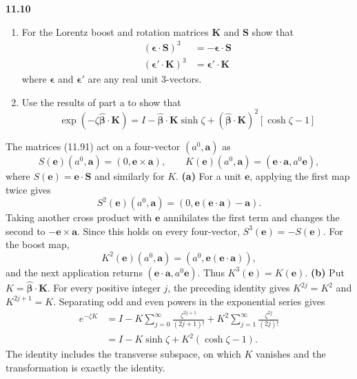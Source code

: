 \par\bigskip
\noindent\textbf{11.10}\quad\begin{enumerate}
\item[(a)] For the Lorentz boost and rotation matrices $\mathbf{K}$ and $\mathbf{S}$ show that
\begin{align*}
(\boldsymbol{\epsilon}\cdot\mathbf{S})^{3}&=-\boldsymbol{\epsilon}\cdot\mathbf{S}\\
(\boldsymbol{\epsilon}'\cdot\mathbf{K})^{3}&=\boldsymbol{\epsilon}'\cdot\mathbf{K}
\end{align*}
where $\boldsymbol{\epsilon}$ and $\boldsymbol{\epsilon}'$ are any real unit 3-vectors.
\item[(b)] Use the results of part a to show that
\[
\exp(-\zeta\hat{\boldsymbol{\beta}}\cdot\mathbf{K})=I-\hat{\boldsymbol{\beta}}\cdot\mathbf{K}\sinh\zeta+(\hat{\boldsymbol{\beta}}\cdot\mathbf{K})^{2}[\cosh\zeta-1]
\]
\end{enumerate}
\solution
The matrices (11.91) act on a four-vector $(a^0,\mathbf a)$ as
\[
S(\mathbf e)(a^0,\mathbf a)=(0,\mathbf e\times\mathbf a),\qquad
K(\mathbf e)(a^0,\mathbf a)=(\mathbf e\cdot\mathbf a,a^0\mathbf e),
\]
where $S(\mathbf e)=\mathbf e\cdot\mathbf S$ and similarly for $K$.
\textbf{(a)} For a unit $\mathbf e$, applying the first map twice gives
\[
S^2(\mathbf e)(a^0,\mathbf a)
=(0,\mathbf e(\mathbf e\cdot\mathbf a)-\mathbf a).
\]
Taking another cross product with $\mathbf e$ annihilates the first
term and changes the second to $-\mathbf e\times\mathbf a$.
Since this holds on every four-vector, $\boxed{S^3(\mathbf e)=-S(\mathbf e)}$.
For the boost map,
\[
K^2(\mathbf e)(a^0,\mathbf a)
=(a^0,\mathbf e(\mathbf e\cdot\mathbf a)),
\]
and the next application returns
$(\mathbf e\cdot\mathbf a,a^0\mathbf e)$.
Thus $\boxed{K^3(\mathbf e)=K(\mathbf e)}$.
\textbf{(b)} Put $K=\widehat{\boldsymbol\beta}\cdot\mathbf K$.
For every positive integer $j$, the preceding identity gives
$K^{2j}=K^2$ and $K^{2j+1}=K$. Separating odd and even powers in
the exponential series gives
\begin{align*}
e^{-\zeta K}
&=I-K\sum_{j=0}^\infty\frac{\zeta^{2j+1}}{(2j+1)!}
 +K^2\sum_{j=1}^\infty\frac{\zeta^{2j}}{(2j)!}\\
&=\boxed{I-K\sinh\zeta+K^2(\cosh\zeta-1).}
\end{align*}
The identity includes the transverse subspace, on which $K$ vanishes
and the transformation is exactly the identity.

